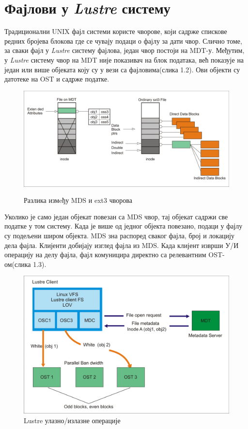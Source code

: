 \section{Фајлови у   \textit{Lustre} систему}
Традиционални UNIX фајл системи користе чворове, који садрже спискове редних бројева блокова
где се чувају подаци о  фајлу за дати чвор. Слично томе, за сваки фајл у   \textit{Lustre} систему фајлова,
један чвор постоји на MDT-у. Међутим, у   \textit{Lustre} систему чвор на MDT није показивач на блок података, већ показује на један или више објеката коју су у вези са фајловима(слика 1.2). Ови објекти су датотеке на OST и садрже податке.

\begin{figure}[h!]
  \centering
      \includegraphics[width=1\textwidth]{slike/lustre_files.png}\\[1cm]
  \caption{Разлика измeђу MDS и ext3 чворова}
\end{figure}
\newpage

Уколико је само један објекат повезан са MDS чвор, тај објекат садржи све податке
у том систему. Када је више од једног објекта повезано, подаци у фајлу 
су подељени широм објекта. MDS зна распоред сваког фајла, број и локацију дела фајла. 
Клијенти добијају изглед фајла из MDS. Када клијент изврши  У/И операцију на делу фајла, 
фајл комуницира директно са релевантним OST-ом(слика 1.3). 

\begin{figure}[h!]
  \centering
      \includegraphics[width=1\textwidth]{slike/lustre_file_i_o.png}
  \caption{Lustre улазно/излазне операције}
\end{figure}

